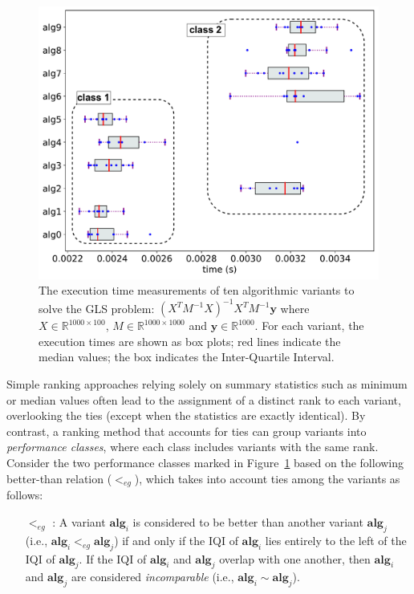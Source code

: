 \documentclass[acmsmall,screen, review]{acmart}
\begin{document}
 \begin{figure}[h!]
	\centering
	\includegraphics[width=0.6\linewidth]{fig/ch3/gls-eg-intro2}
	\caption{The execution time measurements of ten algorithmic variants to solve the GLS problem:  $(X^{T}M^{-1}X)^{-1}X^{T}M^{-1}\mathbf{y}$ where  $X \in \mathbb{R}^{1000 \times 100}$, $M \in \mathbb{R}^{1000 \times 1000}$ and $\mathbf{y} \in \mathbb{R}^{1000}$. For each variant, the execution times are shown as box plots; red lines indicate the median values; the box indicates the Inter-Quartile Interval. }
	\label{fig3:gls-eg-intro}
\end{figure}
Simple ranking approaches relying solely on summary statistics such as minimum or median values often lead to the assignment of a distinct rank to each variant, overlooking the ties (except when the statistics are exactly identical). By contrast, a ranking method that accounts for ties can group variants into \textit{performance classes}, where each class includes variants with the same rank. 
Consider the two performance classes marked in Figure~\ref{fig3:gls-eg-intro} based on the following better-than relation ($<_{eg}$), which takes into account ties among the variants as follows:
\begin{enumerate}
	\item[$<_{eg}$ : ] A variant $\mathbf{alg}_i$ is considered to be better than another variant $\mathbf{alg}_j$ (i.e., $\mathbf{alg}_i <_{eg} \mathbf{alg}_j$) if and only if the IQI of $\mathbf{alg}_i$ lies entirely to the left of the IQI of $\mathbf{alg}_j$.  If the IQI of $\mathbf{alg}_i$ and $\mathbf{alg}_j$ overlap with one another, then  $\mathbf{alg}_i$ and $\mathbf{alg}_j$ are considered \textit{incomparable} (i.e., $\mathbf{alg}_i \sim \mathbf{alg}_j$).
\end{enumerate}
\end{document}
